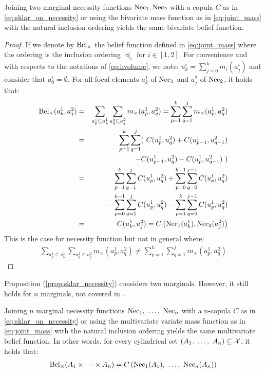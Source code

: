 \begin{proposition}\label{prop:sklar_necessity}
    Joining two marginal necessity functions $\mathrm{Nec}_1, \mathrm{Nec}_2$ with a copula $C$ as in \eqref{eq:sklar_on_necessity} or using the bivariate mass function as in \eqref{eq:joint_mass} with the natural inclusion ordering yields the same bivariate belief function.
\end{proposition}

\begin{proof}
    If we denote by $\mathrm{Bel}_\times$ the belief function defined in \eqref{eq:joint_mass} where the ordering is the inclusion ordering $\preceq_i$ for $i\in[1,2]$. For convenience and with respects to the notations of \cref{eq:hvolume}, we note: $u^i_k=\sum_{j=0}^{k}m_i(a_j^i)$ and consider that $a^i_0=\emptyset$.
    For all focal elements $a_k^1$ of $\mathrm{Nec}_1$ and $a^2_j$ of $\mathrm{Nec}_2$, it holds that:
    \begin{eqnarray*}
        \mathrm{Bel}_\times(a^1_k, a^2_j) &=& \sum_{a^1_p\subseteq a_k^1}\sum_{a^2_q\subseteq a_j^2}m_\times(a^1_p, a^2_q) = \sum_{p=1}^k\sum_{q=1}^j m_\times(a^1_p, a^2_q)\\
        &=&\sum_{p=1}^k\sum_{q=1}^j (~C(u^1_p, u^2_q) + C(u^1_{p-1}, u^2_{q-1}) \\
        &&- C(u^1_{p-1}, u^2_{q}) - C(u^1_{p}, u^2_{q-1})~)\\
        &=&\sum_{p=1}^k\sum_{q=1}^jC(u^1_p, u^2_q) + \sum_{p=0}^{k-1}\sum_{q=0}^{j-1}C(u^1_p, u^2_q) \\
        &&- \sum_{p=0}^{k-1}\sum_{q=1}^jC(u^1_p, u^2_q) - \sum_{p=1}^k\sum_{q=0}^{j-1}C(u^1_p, u^2_q)\\
        &=& C(u^1_k, u^2_j) = C\left(\mathrm{Nec}_1(a_k^1), \mathrm{Nec}_2(a_j^2)\right)\\
    \end{eqnarray*}
    This is the case for necessity function but not in general where:
    \begin{align*}
        \sum_{a^1_p\subseteq a_k^1}\sum_{a^2_q\subseteq a_j^2}m_\times(a^1_p, a^2_q) \neq \sum_{p=1}^k\sum_{q=1}^j m_\times(a^1_p, a^2_q)
    \end{align*}
\end{proof}

Proposition (\ref{prop:sklar_necessity}) considers two marginals. However, it still holds for $n$ marginals, not covered in \cite{schmelzer_sklars_2015}.
\begin{proposition}
   Joining $n$ marginal necessity functions $\mathrm{Nec}_1 , ~\dots, ~ \mathrm{Nec}_n$ with a n-copula $C$ as in \eqref{eq:sklar_on_necessity} or using the multivariate variate mass function as in \eqref{eq:joint_mass} with the natural inclusion ordering yields the same multivariate belief function. In other words, for every cylindrical set $(A_1 , ~\dots, ~ A_n)\subseteq\mathcal{X}$, it holds that:
\begin{eqnarray}
    \mathrm{Bel}_\times(A_1\times\dots\times A_n) = C\left(\mathrm{Nec}_1(A_1) , ~\dots, ~ \mathrm{Nec}_n(A_n)\right)
\end{eqnarray}
\end{proposition}

